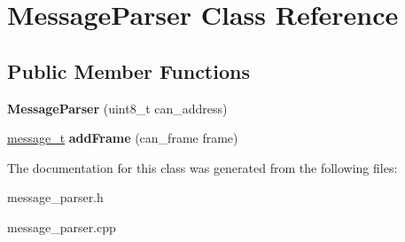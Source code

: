 \hypertarget{classMessageParser}{}\section{Message\+Parser Class Reference}
\label{classMessageParser}
\subsection*{Public Member Functions}
\begin{DoxyCompactItemize}
\item 
\mbox{\label{classMessageParser_abd504499821ba3076c3b5fcbe9709f59}} 
{\bfseries Message\+Parser} (uint8\+\_\+t can\+\_\+address)
\item 
\mbox{\label{classMessageParser_a6106b34b152ee12e88e6a00cc88cb614}} 
\hyperlink{structMessage}{message\+\_\+t} {\bfseries add\+Frame} (can\+\_\+frame frame)
\end{DoxyCompactItemize}


The documentation for this class was generated from the following files\+:\begin{DoxyCompactItemize}
\item 
message\+\_\+parser.\+h\item 
message\+\_\+parser.\+cpp\end{DoxyCompactItemize}
